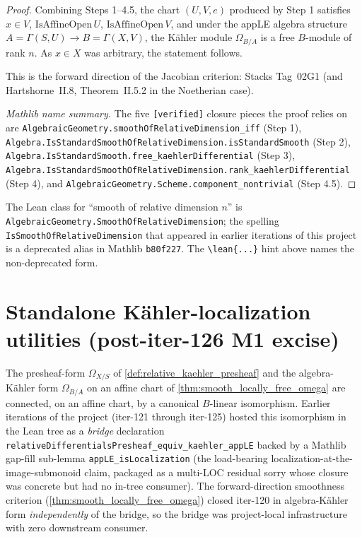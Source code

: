 \begin{proof}
  Combining Steps 1--4.5, the chart \((U, V, e)\) produced by Step 1 satisfies \(x \in V\), \(\mathrm{IsAffineOpen}\,U\), \(\mathrm{IsAffineOpen}\,V\), and under the appLE algebra structure \(A = \Gamma(S, U) \to B = \Gamma(X, V)\), the K\"ahler module \(\Omega_{B/A}\) is a free \(B\)-module of rank \(n\). As \(x \in X\) was arbitrary, the statement follows.

  This is the forward direction of the Jacobian criterion: Stacks Tag~02G1 (and Hartshorne~II.8, Theorem~II.5.2 in the Noetherian case).

  \emph{Mathlib name summary.} The five \texttt{[verified]} closure pieces the proof relies on are
  \texttt{AlgebraicGeometry.smoothOfRelativeDimension\_iff} (Step 1),
  \texttt{Algebra.IsStandardSmoothOfRelativeDimension.isStandardSmooth} (Step 2),
  \texttt{Algebra.IsStandardSmooth.free\_kaehlerDifferential} (Step 3),
  \texttt{Algebra.IsStandardSmoothOfRelativeDimension.rank\_kaehlerDifferential} (Step 4),
  and \texttt{AlgebraicGeometry.Scheme.component\_nontrivial} (Step 4.5).
\end{proof}

\begin{remark}
  \label{rem:smooth_class_naming}
  The Lean class for ``smooth of relative dimension \(n\)'' is \texttt{AlgebraicGeometry.SmoothOfRelativeDimension}; the spelling \texttt{IsSmoothOfRelativeDimension} that appeared in earlier iterations of this project is a deprecated alias in Mathlib \texttt{b80f227}. The \texttt{\textbackslash lean\{...\}} hint above names the non-deprecated form.
\end{remark}

\section{Standalone K\"ahler-localization utilities (post-iter-126 M1 excise)}
\label{sec:bridge}

The presheaf-form \(\Omega_{X/S}\) of \cref{def:relative_kaehler_presheaf} and the algebra-K\"ahler form \(\Omega_{B / A}\) on an affine chart of \cref{thm:smooth_locally_free_omega} are connected, on an affine chart, by a canonical \(B\)-linear isomorphism. Earlier iterations of the project (iter-121 through iter-125) hosted this isomorphism in the Lean tree as a \emph{bridge} declaration \texttt{relativeDifferentialsPresheaf\_equiv\_kaehler\_appLE} backed by a Mathlib gap-fill sub-lemma \texttt{appLE\_isLocalization} (the load-bearing localization-at-the-image-submonoid claim, packaged as a multi-LOC residual sorry whose closure was concrete but had no in-tree consumer). The forward-direction smoothness criterion (\cref{thm:smooth_locally_free_omega}) closed iter-120 in algebra-K\"ahler form \emph{independently} of the bridge, so the bridge was project-local infrastructure with zero downstream consumer.

